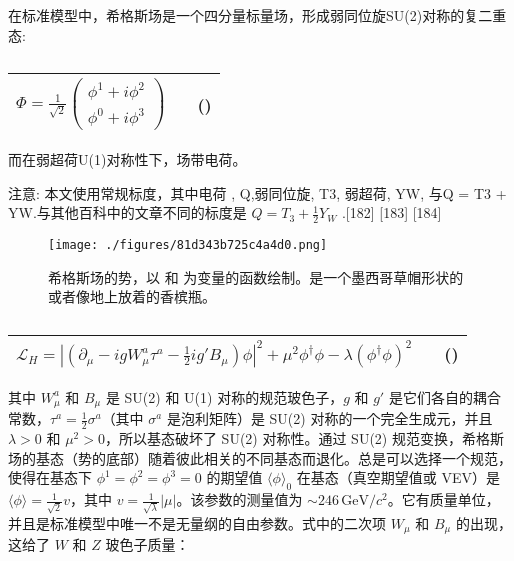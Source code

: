 在标准模型中，希格斯场是一个四分量标量场，形成弱同位旋SU(2)对称的复二重态:
\begin{table}[h]
\centering
\caption\label{tab_Higgs_2}
\begin{tabular}{|c|c|c|}
\hline
$\Phi = \frac{1}{\sqrt{2}} \left( \begin{array}{c}\phi^1 + i\phi^2 \\\phi^0 + i\phi^3\end{array} \right)$ & & () \\
\hline
\end{tabular}
\end{table}

而在弱超荷U(1)对称性下，场带电荷。

注意: 本文使用常规标度，其中电荷 , Q,弱同位旋, T3, 弱超荷, YW, 与Q = T3 + YW.与其他百科中的文章不同的标度是 $Q = T_3 + \frac{1}{2} Y_W$ .[182] [183] [184]

\begin{figure}[ht]
\centering
\texttt{[image: ./figures/81d343b725c4a4d0.png]}
\caption{希格斯场的势，以 和 为变量的函数绘制。是一个墨西哥草帽形状的或者像地上放着的香槟瓶。} \label{fig_Higgs_18}
\end{figure}

\begin{table}[h]
\centering
\caption\label{tab_Higgs_3}
\begin{tabular}{|c|c|c|}
\hline
$\mathcal{L}_H = \left| \left( \partial_\mu - ig W_\mu^a \tau^a - \frac{1}{2} ig' B_\mu \right) \phi \right|^2 + \mu^2 \phi^\dagger \phi - \lambda (\phi^\dagger \phi)^2$ & & () \\
\hline
\end{tabular}
\end{table}

其中 $W_\mu^a$ 和 $B_\mu$ 是 SU(2) 和 U(1) 对称的规范玻色子，$g$ 和 $g'$ 是它们各自的耦合常数，$\tau^a = \frac{1}{2} \sigma^a$（其中 $\sigma^a$ 是泡利矩阵）是 SU(2) 对称的一个完全生成元，并且 $\lambda > 0$ 和 $\mu^2 > 0$，所以基态破坏了 SU(2) 对称性。通过 SU(2) 规范变换，希格斯场的基态（势的底部）随着彼此相关的不同基态而退化。总是可以选择一个规范，使得在基态下 $\phi^1 = \phi^2 = \phi^3 = 0$ 的期望值 $\langle \phi \rangle_0$ 在基态（真空期望值或 VEV）是 $\langle \phi \rangle = \frac{1}{\sqrt{2}} v$，其中 $v = \frac{1}{\sqrt{\lambda}}|\mu|$。该参数的测量值为 $\sim 246 \, \text{GeV}/c^2$。它有质量单位，并且是标准模型中唯一不是无量纲的自由参数。式中的二次项 $W_\mu$ 和 $B_\mu$ 的出现，这给了 $W$ 和 $Z$ 玻色子质量：

